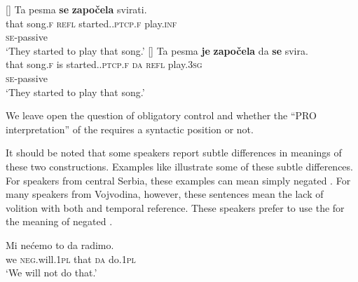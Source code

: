 \documentclass[output=paper,modfonts,newtxmath,hidelinks,]{langscibook}
\begin{document}
\ea \label{7:ex16}
	[]{ \label{7:ex16a2}
		 \gll Ta pesma \textbf{se} \textbf{započela} svirati.\\
         	  that song.\textsc{f} \textsc{refl} started.\textsc{.ptcp.f} play.\textsc{inf}\\\hfill\textsc{se}-passive\\
		\glt `They started to play that song.'
	}
	[]{ \label{7:ex16b2}
		\gll Ta pesma \textbf{je} \textbf{započela} da \textbf{se} svira.\\
        	 that song.\textsc{f} is started.\textsc{.ptcp.f} \textsc{da} \textsc{refl} play.\textsc{3sg}\\\hfill\textsc{se}-passive\\
		\glt `They started to play that song.'
	}
	\z
\z

\noindent We leave open the question of obligatory control and whether the ``PRO interpretation'' of the  requires a syntactic position or not. 

It should be noted that some speakers report subtle differences in meanings of these two constructions. Examples like  illustrate some of these subtle differences. For speakers from central Serbia, these examples can mean simply negated . For many speakers from Vojvodina, however, these sentences mean the lack of volition with both  and  temporal reference. These speakers prefer to use the  for the meaning of negated .

\ea \label{7:ex17}
\gll Mi nećemo to da radimo.\\
     we \textsc{neg.}will.\textsc{1pl} that \textsc{da} do.\textsc{1pl}\\
\glt `We will not do that.'
\z
\end{document}
